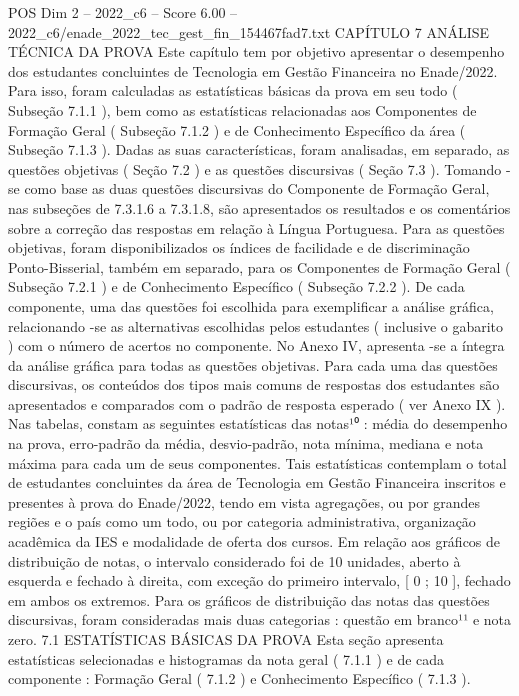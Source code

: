 \begin{textsample}{POS Dim 2 – 2022\_c6 – Score 6.00 – 2022\_c6/enade\_2022\_tec\_gest\_fin\_154467fad7.txt}  \label{ex:f2_pos_140}
CAPÍTULO 7 ANÁLISE TÉCNICA DA PROVA Este capítulo tem por objetivo apresentar o desempenho dos estudantes concluintes de Tecnologia em Gestão Financeira no Enade/2022.
Para isso, foram calculadas as estatísticas básicas da prova em seu todo ( Subseção 7.1.1 ), bem como as estatísticas relacionadas aos Componentes de Formação Geral ( Subseção 7.1.2 ) e de Conhecimento Específico da área ( Subseção 7.1.3 ).
Dadas as suas características, foram analisadas, em separado, as questões objetivas ( Seção 7.2 ) e as questões discursivas ( Seção 7.3 ).
Tomando -se como base as duas questões discursivas do Componente de Formação Geral, nas subseções de 7.3.1.6 a 7.3.1.8, são apresentados os resultados e os comentários sobre a correção das respostas em relação à Língua Portuguesa.
Para as questões objetivas, foram disponibilizados os índices de facilidade e de discriminação Ponto-Bisserial, também em separado, para os Componentes de Formação Geral ( Subseção 7.2.1 ) e de Conhecimento Específico ( Subseção 7.2.2 ).
De cada componente, uma das questões foi escolhida para exemplificar a análise gráfica, relacionando -se as alternativas escolhidas pelos estudantes ( inclusive o gabarito ) com o número de acertos no componente.
No Anexo IV, apresenta -se a íntegra da análise gráfica para todas as questões objetivas.
Para cada uma das questões discursivas, os conteúdos dos tipos mais comuns de respostas dos estudantes são apresentados e comparados com o padrão de resposta esperado ( ver Anexo IX ).
Nas tabelas, constam as seguintes estatísticas das notas¹⁰ : média do desempenho na prova, erro-padrão da média, desvio-padrão, nota mínima, mediana e nota máxima para cada um de seus componentes.
Tais estatísticas contemplam o total de estudantes concluintes da área de Tecnologia em Gestão Financeira inscritos e presentes à prova do Enade/2022, tendo em vista agregações, ou por grandes regiões e o país como um todo, ou por categoria administrativa, organização acadêmica da IES e modalidade de oferta dos cursos.
Em relação aos gráficos de distribuição de notas, o intervalo considerado foi de 10 unidades, aberto à esquerda e fechado à direita, com exceção do primeiro intervalo, [ 0 ; 10 ], fechado em ambos os extremos.
Para os gráficos de distribuição das notas das questões discursivas, foram consideradas mais duas categorias : questão em branco¹¹ e nota zero. 7.1 ESTATÍSTICAS BÁSICAS DA PROVA Esta seção apresenta estatísticas selecionadas e histogramas da nota geral ( 7.1.1 ) e de cada componente : Formação Geral ( 7.1.2 ) e Conhecimento Específico ( 7.1.3 ).

\end{textsample}
